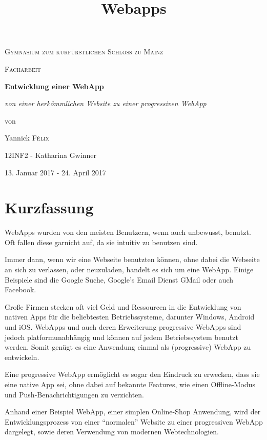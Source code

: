 \documentclass[a4paper,12pt,ngerman,listof=numbered]{scrartcl}      %
\title{Webapps}  %
\begin{document}
	
	\begin{titlepage}
		\centering
		{\scshape\Large Gymnasium zum kurf\"{u}rstlichen Schloss zu Mainz \par}
		\vspace{0.5cm}
		{\scshape\Large Facharbeit\par}
		\vspace{2.5cm}
		{\huge\bfseries Entwicklung einer WebApp\par}
		\vspace{1cm}
		{\Large\itshape von einer herkömmlichen Website zu einer progressiven WebApp\par}
		\vfill
		von\par
		Yannick \textsc{F\'elix}\par
		{\small 12INF2 - Katharina Gwinner}
		
		\vspace{3cm}
		
		{\large 13. Januar 2017 - 24. April 2017 \par}
		\newpage
	\end{titlepage}
	
	\setcounter{page}{1}
	\section{Kurzfassung}
	WebApps wurden von den meisten Benutzern, wenn auch unbewusst, benutzt. Oft fallen diese garnicht auf, da sie intuitiv zu benutzen sind.\par
	Immer dann, wenn wir eine Webseite benutzten können, ohne dabei die Webseite an sich zu verlassen, oder neuzuladen, handelt es sich um eine WebApp. Einige Beispiele sind die Google Suche, Google's Email Dienst GMail oder auch Facebook.\par
	Große Firmen stecken oft viel Geld und Ressourcen in die Entwicklung von nativen Apps für die beliebtesten Betriebssysteme, darunter Windows, Android und iOS. WebApps und auch deren Erweiterung progressive WebApps sind jedoch platformunabhängig und können auf jedem Betriebssystem benutzt werden. Somit genügt es eine Anwendung einmal als (progressive) WebApp zu entwickeln.\par
	Eine progressive WebApp ermöglicht es sogar den Eindruck zu erwecken, dass sie eine native App sei, ohne dabei auf bekannte Features, wie einen Offline-Modus und Push-Be\-nach\-rich\-ti\-gungen zu verzichten.\par
	Anhand einer Beispiel WebApp, einer simplen Online-Shop Anwendung, wird der Entwicklungsprozess von einer ``normalen'' Website zu einer progressiven Web\-App dargelegt, sowie deren Verwendung von modernen Webtechnologien.\par
	
\end{document}
